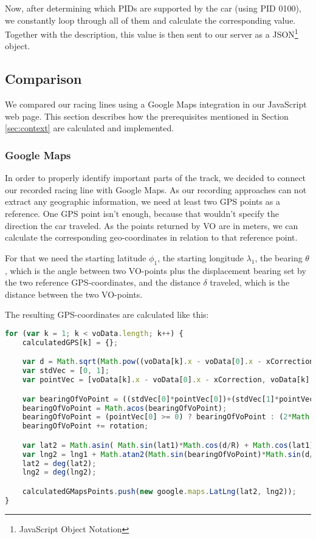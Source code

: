 Now, after determining which PIDs are supported by the car (using PID 0100), we constantly loop through all of them and calculate the corresponding value. Together with the description, this value is then sent to our server as a JSON\footnote{JavaScript Object Notation} object.

\subsection{Comparison}
We compared our racing lines using a Google Maps integration in our JavaScript web page. This section describes how the prerequisites mentioned in Section \ref{sec:context} are calculated and implemented.

\subsubsection{Google Maps}
In order to properly identify important parts of the track, we decided to connect our recorded racing line with Google Maps. As our recording approaches can not extract any geographic information, we need at least two GPS points as a reference. One GPS point isn't enough, because that wouldn't specify the direction the car traveled. As the points returned by VO are in meters, we can calculate the corresponding geo-coordinates in relation to that reference point. 

For that we need the starting latitude $\phi_1$, the starting longitude $\lambda_1$, the bearing $\theta$, which is the angle between two VO-points plus the displacement bearing set by the two reference GPS-coordinates, and the distance $\delta$ traveled, which is the distance between the two VO-points.

The resulting GPS-coordinates are calculated like this:

\begin{lstlisting}[language=JavaScript]
for (var k = 1; k < voData.length; k++) {
	calculatedGPS[k] = {};

	var d = Math.sqrt(Math.pow((voData[k].x - voData[0].x - xCorrection), 2) + Math.pow((voData[k].y - voData[0].y - yCorrection), 2)) * voScaleFactor / 1000;
	var stdVec = [0, 1];
	var pointVec = [voData[k].x - voData[0].x - xCorrection, voData[k].y - voData[0].y - yCorrection];

	var bearingOfVoPoint = ((stdVec[0]*pointVec[0])+(stdVec[1]*pointVec[1]))/(Math.sqrt(Math.pow(stdVec[0], 2)+Math.pow(stdVec[1], 2))*Math.sqrt(Math.pow(pointVec[0], 2)+Math.pow(pointVec[1], 2)));
	bearingOfVoPoint = Math.acos(bearingOfVoPoint);
	bearingOfVoPoint = (pointVec[0] >= 0) ? bearingOfVoPoint : (2*Math.PI)-bearingOfVoPoint;
	bearingOfVoPoint += rotation;

	var lat2 = Math.asin( Math.sin(lat1)*Math.cos(d/R) + Math.cos(lat1)*Math.sin(d/R)*Math.cos(bearingOfVoPoint) );
	var lng2 = lng1 + Math.atan2(Math.sin(bearingOfVoPoint)*Math.sin(d/R)*Math.cos(lat1), Math.cos(d/R)-Math.sin(lat1)*Math.sin(lat2));
	lat2 = deg(lat2);
	lng2 = deg(lng2);

	calculatedGMapsPoints.push(new google.maps.LatLng(lat2, lng2));
}
\end{lstlisting}

